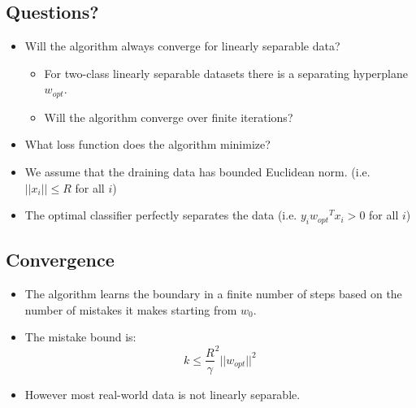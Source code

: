 \documentclass[12pt]{article}
\begin{document}
        \subsection{Questions?}
            \begin{itemize}
                \item Will the algorithm always converge for linearly separable data?
                \begin{itemize}
                    \item For two-class linearly separable datasets there is a separating hyperplane $w_{opt}$.
                    \item Will the algorithm converge over finite iterations?
                \end{itemize}
                \item What loss function does the algorithm minimize?
                \item We assume that the draining data has bounded Euclidean norm. (i.e. $||x_i|| \le R$ for all $i$)
                \item The optimal classifier perfectly separates the data (i.e. $y_i{w_{opt}}^T{x_i} > 0$ for all $i$)
            \end{itemize}
        \subsection{Convergence}
            \begin{itemize}
                \item The algorithm learns the boundary in a finite number of steps based on the number of mistakes it makes starting from $w_0$.
                \item The mistake bound is:
                \begin{equation}
                    k \le {\frac{R}{\gamma}}^2{||w_{opt}||}^2
                \end{equation}
                \item However most real-world data is not linearly separable.
            \end{itemize}
\end{document}
